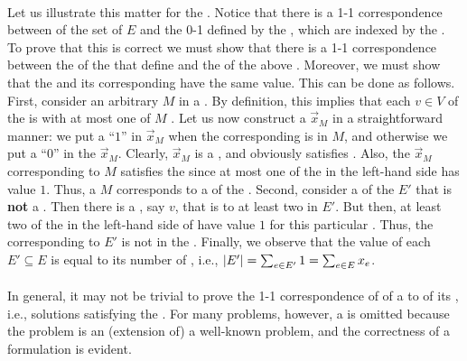 \paragraph{}
Let us illustrate this matter for the . Notice that there is a 1-1 correspondence between  of the set of  $E$ and the 0-1  defined by the , which are indexed by the . To prove that this  is correct we must show that there is a 1-1 correspondence between the  of the  that define  and the  of the above . Moreover, we must show that the  and its corresponding  have the same value. This can be done as follows. First, consider an arbitrary  $M$ in a . By definition, this implies that each  $v\in V$ of the  is  with at most one  of $M$ . Let us now construct a  $\vec{x}_M$ in a straightforward manner: we put a ``$1$'' in $\vec{x}_M$ when the corresponding  is in $M$, and otherwise we put a ``$0$'' in the  $\vec{x}_M$. Clearly, $\vec{x}_M$ is a , and obviously satisfies . Also, the  $\vec{x}_M$ corresponding to $M$ satisfies the   since at most one of the  in the left-hand side has value $1$. Thus, a  $M$ corresponds to a  of the . Second, consider a  of the  $E'$ that is \textbf{not} a . Then there is a , say $v$, that is  to at least two  in $E'$. But then, at least two of the  in the left-hand side of  have value $1$ for this particular . Thus, the  corresponding to $E'$ is not  in the . Finally, we observe that the value of each  $E'\subseteq E$ is equal to its number of , i.e., $\abs{E'}=\isumdomain[e]{E'}{1}=\isumdomain[e]{E}{x_e}$.

\paragraph{}
In general, it may not be trivial to prove the 1-1 correspondence of  of a  to  of its , i.e., solutions satisfying the . For many problems, however, a  is omitted because the problem is an (extension of) a well-known problem, and the correctness of a formulation is evident.

